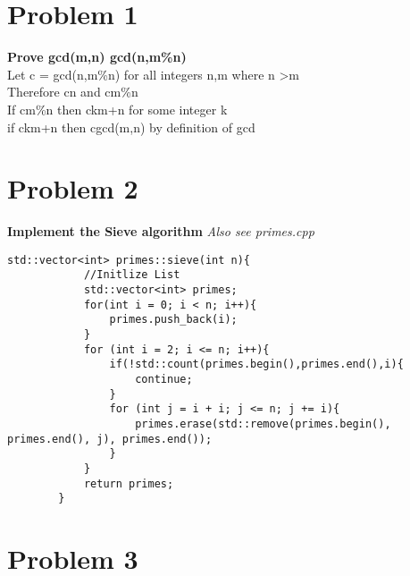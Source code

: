 \documentclass[12pt,letterpaper]{article}
\begin{document}
\section*{Problem 1}
\textbf{Prove gcd(m,n) \textbar{} gcd(n,m\%n)}\\

Let c = gcd(n,m\%n) for all integers n,m where n \textgreater m\\
Therefore c\textbar{}n and c\textbar{}m\%n\\
If c\textbar{}m\%n then c\textbar{}km+n for some integer k\\
if c\textbar{}km+n then c\textbar{}gcd(m,n) by definition of gcd

\section*{Problem 2}
\textbf{Implement the Sieve algorithm}
\textit{Also see primes.cpp}

     \begin{lstlisting}[style = C++]
        std::vector<int> primes::sieve(int n){
            //Initlize List
            std::vector<int> primes;
            for(int i = 0; i < n; i++){
                primes.push_back(i);
            }
            for (int i = 2; i <= n; i++){
                if(!std::count(primes.begin(),primes.end(),i){
                    continue;
                }
                for (int j = i + i; j <= n; j += i){
                    primes.erase(std::remove(primes.begin(), primes.end(), j), primes.end());
                }
            }
            return primes;
        }          
    \end{lstlisting}
\newpage

\section*{Problem 3}
\end{document}
